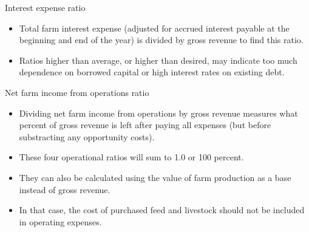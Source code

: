 \documentclass[12pt,ignorenonframetext,aspectratio=169]{beamer}
\providecommand{\tightlist}{%
  \setlength{\itemsep}{0pt}\setlength{\parskip}{0pt}}
\begin{document}
\begin{frame}{Interest expense ratio}
\protect\hypertarget{interest-expense-ratio}{}
\begin{itemize}
\tightlist
\item
  Total farm interest expense (adjusted for accrued interest payable at
  the beginning and end of the year) is divided by gross revenue to find
  this ratio.
\item
  Ratios higher than average, or higher than desired, may indicate too
  much dependence on borrowed capital or high interest rates on existing
  debt.
\end{itemize}
\end{frame}

\begin{frame}{Net farm income from operations ratio}
\protect\hypertarget{net-farm-income-from-operations-ratio}{}
\begin{itemize}
\tightlist
\item
  Dividing net farm income from operations by gross revenue measures
  what percent of gross revenue is left after paying all expenses (but
  before substracting any opportunity costs).
\item
  These four operational ratios will sum to 1.0 or 100 percent.
\item
  They can also be calculated using the value of farm production as a
  base instead of gross revenue.
\item
  In that case, the cost of purchased feed and livestock should not be
  included in operating expenses.
\end{itemize}
\end{frame}
\end{document}
